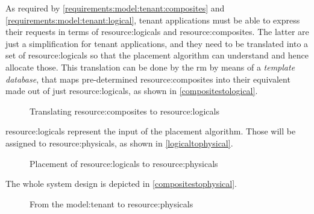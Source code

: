 As required by \ref{requirements:model:tenant:composites} and \ref{requirements:model:tenant:logical}, tenant applications must be able to express their requests in terms of \glspl{resource:logical} and \glspl{resource:composite}.
The latter are just a simplification for tenant applications, and they need to be translated into a set of \glspl{resource:logical} so that the placement algorithm can understand and hence allocate those.
This translation can be done by the \gls{rm} by means of a \textit{template database}, that maps pre-determined \glspl{resource:composite} into their equivalent made out of just \glspl{resource:logical}, as shown in \autoref{compositestological}.

\begin{figure}[!htb]
    \centering
    \usebox{\compositestological}
    \caption{Translating \glspl{resource:composite} to \glspl{resource:logical}}
    \label{compositestological}
\end{figure}

\Glspl{resource:logical} represent the input of the placement algorithm. Those will be assigned to \glspl{resource:physical}, as shown in \autoref{logicaltophysical}.

\begin{figure}[!htb]
    \centering
    \usebox{\logicaltophysical}
    \caption{Placement of \glspl{resource:logical} to \glspl{resource:physical}}
    \label{logicaltophysical}
\end{figure}

The whole system design is depicted in \autoref{compositestophysical}.

\begin{figure}[!htb]
    \centering
    \usebox{\compositestophysical}
    \caption{From the \gls{model:tenant} to \glspl{resource:physical}}
    \label{compositestophysical}
\end{figure}